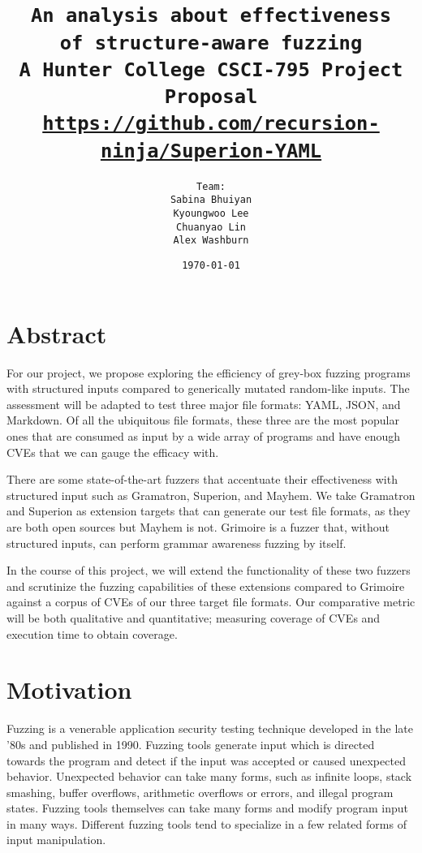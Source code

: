 \documentclass[12pt]{diazessay}
\title{\texttt{\huge{An analysis about effectiveness\\of structure-aware fuzzing} \\\vspace{-0.65cm} {\large A Hunter College CSCI-795 Project Proposal}\\\normalsize\url{https://github.com/recursion-ninja/Superion-YAML}}} %
\author{\texttt{{\Huge Team:}\\\vspace*{-0.5em} 
		Sabina Bhuiyan \\\vspace*{-0.5em} 
		Kyoungwoo Lee \\\vspace*{-0.5em}
		Chuanyao Lin \\\vspace*{-0.25em}
		Alex Washburn}} %
\date{\texttt{\today}} %
\begin{document}
\maketitle %

\vspace{-2cm}
\section*{Abstract}


For our project, we propose exploring the efficiency of grey-box fuzzing programs with structured inputs compared to generically mutated random-like inputs.
The assessment will be adapted to test three major file formats: YAML, JSON, and Markdown.
Of all the ubiquitous file formats, these three are the most popular ones that are consumed as input by a wide array of programs and have enough CVEs that we can gauge the efficacy with.

There are some state-of-the-art fuzzers that accentuate their effectiveness with structured input such as Gramatron, Superion, and Mayhem.
We take Gramatron and Superion as extension targets that can generate our test file formats, as they are both open sources but Mayhem is not.
Grimoire is a fuzzer that, without structured inputs, can perform grammar awareness fuzzing by itself.

In the course of this project, we will extend the functionality of these two fuzzers and scrutinize the fuzzing capabilities of these extensions compared to Grimoire against a corpus of CVEs of our three target file formats.
Our comparative metric will be both qualitative and quantitative; measuring coverage of CVEs and execution time to obtain coverage.

\clearpage
\section*{Motivation}

Fuzzing is a venerable application security testing technique developed in the late '80s\cite{Barton1988} and published in 1990\cite{Miller1990}.
Fuzzing tools generate input which is directed towards the program and detect if the input was accepted or caused unexpected behavior.
Unexpected behavior can take many forms, such as infinite loops, stack smashing, buffer overflows, arithmetic overflows or errors, and illegal program states.
Fuzzing tools themselves can take many forms\cite{ModelBasedFuzzing}\cite{GrammarBasedFuzzing}\cite{ProtocolBasedFuzzing} and modify program input in many ways.
Different fuzzing tools tend to specialize in a few related forms of input\cite{InputDiversity} manipulation.
\end{document}
